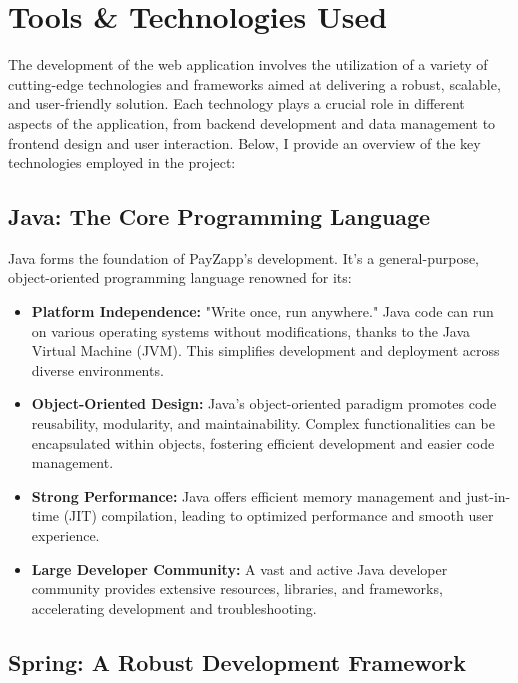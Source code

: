 \documentclass[12pt,a4paper]{report}
\begin{document}
\chapter{Tools \& Technologies Used}

The development of the web application involves the utilization of a variety of cutting-edge technologies and frameworks aimed at delivering a robust, scalable, and user-friendly solution. Each technology plays a crucial role in different aspects of the application, from backend development and data management to frontend design and user interaction. Below, I provide an overview of the key technologies employed in the project:

\section{Java: The Core Programming Language}

Java forms the foundation of PayZapp's development. It's a general-purpose, object-oriented programming language renowned for its:

\begin{itemize}
    \item \textbf{Platform Independence:} "Write once, run anywhere." Java code can run on various operating systems without modifications, thanks to the Java Virtual Machine (JVM). This simplifies development and deployment across diverse environments.
    
    \item \textbf{Object-Oriented Design:} Java's object-oriented paradigm promotes code reusability, modularity, and maintainability. Complex functionalities can be encapsulated within objects, fostering efficient development and easier code management.
    
    \item \textbf{Strong Performance:} Java offers efficient memory management and just-in-time (JIT) compilation, leading to optimized performance and smooth user experience.
    
    \item \textbf{Large Developer Community:} A vast and active Java developer community provides extensive resources, libraries, and frameworks, accelerating development and troubleshooting.
\end{itemize}
\section{Spring: A Robust Development Framework}
\end{document}
